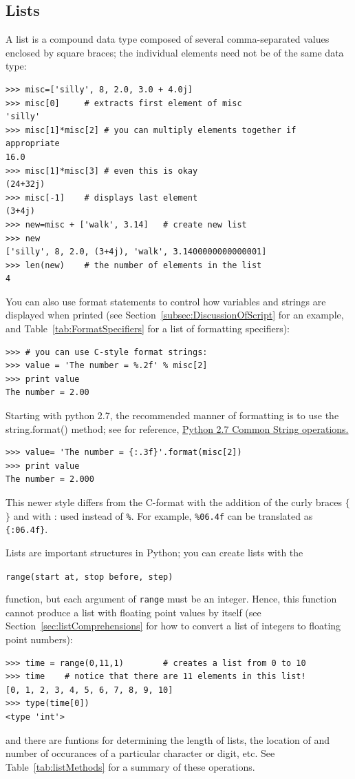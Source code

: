 \subsection{Lists}
\label{subsec-lists}
A list is a compound data type composed of several comma-separated values enclosed by square braces; the individual elements need not be of the same data type:
\begin{lstlisting}[frame=none]
>>> misc=['silly', 8, 2.0, 3.0 + 4.0j]
>>> misc[0]		# extracts first element of misc
'silly'
>>> misc[1]*misc[2]	# you can multiply elements together if appropriate
16.0
>>> misc[1]*misc[3]	# even this is okay
(24+32j)
>>> misc[-1]	# displays last element
(3+4j)
>>> new=misc + ['walk', 3.14]	# create new list 
>>> new
['silly', 8, 2.0, (3+4j), 'walk', 3.1400000000000001]
>>> len(new)	# the number of elements in the list
4

\end{lstlisting}
You can also use format statements to control how variables and strings are displayed when printed (see Section~\ref{subsec:DiscussionOfScript} for an example, and Table~\ref{tab:FormatSpecifiers} for a list of formatting specifiers):
\begin{lstlisting}[frame=none]
>>> # you can use C-style format strings:
>>> value = 'The number = %.2f' % misc[2]	
>>> print value
The number = 2.00
\end{lstlisting}

Starting with python 2.7, the recommended manner of formatting is to use the string.format() method; see for reference,
\href{http://docs.python.org/2/library/string.html}{Python 2.7 Common String operations.}
\begin{lstlisting}[frame=none]
>>> value= 'The number = {:.3f}'.format(misc[2])
>>> print value
The number = 2.000
\end{lstlisting}
This newer style differs from the C-format with the addition of the curly braces $\{$ $\}$ and with : used instead of \verb!%!. For example, \verb!%06.4f! can be translated as \verb!{:06.4f}!.

Lists are important structures in Python; you can create lists with the\\[-5mm]
\begin{center} \texttt{range(start at, stop before, step)} \end{center}
function, but each argument of \texttt{range{}} must be an integer. Hence, this function cannot produce a list with floating point values by itself (see Section~\ref{sec:listComprehensions} for how to convert a list of integers to floating point numbers):
\begin{lstlisting}[frame=none]
>>> time = range(0,11,1)		# creates a list from 0 to 10 
>>> time	# notice that there are 11 elements in this list!
[0, 1, 2, 3, 4, 5, 6, 7, 8, 9, 10]
>>> type(time[0])
<type 'int'>
\end{lstlisting}
and there are funtions for determining the length of lists, the location of and number of occurances of a particular character or digit, etc. See Table~\ref{tab:listMethods} for a summary of these operations. 


